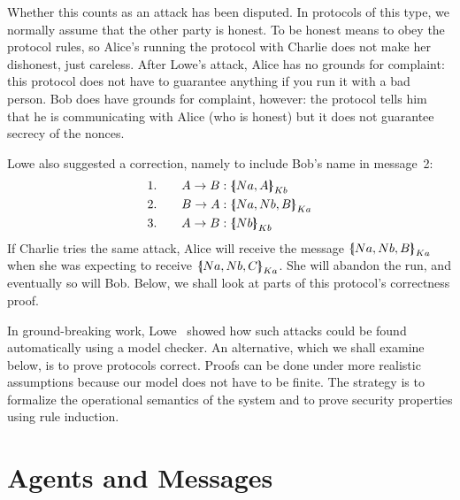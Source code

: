 Whether this counts as an attack has been disputed.  In protocols of this
type, we normally assume that the other party is honest.  To be honest
means to obey the protocol rules, so Alice's running the protocol with
Charlie does not make her dishonest, just careless.  After Lowe's
attack, Alice has no grounds for complaint: this protocol does not have to
guarantee anything if you run it with a bad person.  Bob does have
grounds for complaint, however: the protocol tells him that he is
communicating with Alice (who is honest) but it does not guarantee
secrecy of the nonces.

Lowe also suggested a correction, namely to include Bob's name in
message~2:
\begin{alignat*}{2}
  &1.&\quad  A\to B  &: \mathopen{\{\kern-.30em|} Na,A\mathclose{|\kern-.32em\}}\sb{Kb} \\
  &2.&\quad  B\to A  &: \mathopen{\{\kern-.30em|} Na,Nb,B\mathclose{|\kern-.32em\}}\sb{Ka} \\
  &3.&\quad  A\to B  &: \mathopen{\{\kern-.30em|} Nb\mathclose{|\kern-.32em\}}\sb{Kb}
\end{alignat*}
If Charlie tries the same attack, Alice will receive the message
$\mathopen{\{\kern-.30em|} Na,Nb,B\mathclose{|\kern-.32em\}}\sb{Ka}$ when she was expecting to receive
$\mathopen{\{\kern-.30em|} Na,Nb,C\mathclose{|\kern-.32em\}}\sb{Ka}$.  She will abandon the run, and eventually so
will Bob.  Below, we shall look at parts of this protocol's correctness
proof. 

In ground-breaking work, Lowe~\cite{lowe-fdr} showed how such attacks
could be found automatically using a model checker.  An alternative,
which we shall examine below, is to prove protocols correct.  Proofs
can be done under more realistic assumptions because our model does
not have to be finite.  The strategy is to formalize the operational
semantics of the system and to prove security properties using rule
induction.


\section{Agents and Messages}

